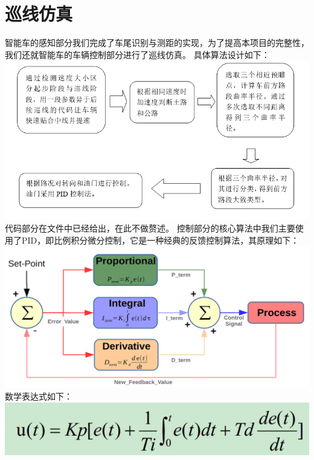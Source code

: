 \documentclass[12pt]{report}
\begin{document}
\section{巡线仿真}
智能车的感知部分我们完成了车尾识别与测距的实现，为了提高本项目的完整性，我们还就智能车的车辆控制部分进行了巡线仿真。
\newline\newline
具体算法设计如下：
\newline
\includegraphics[scale=0.5]{cc.png}
\\代码部分在文件中已经给出，在此不做赘述。
\newline\newline
控制部分的核心算法中我们主要使用了PID，即比例积分微分控制，它是一种经典的反馈控制算法，其原理如下：
\newline 
\includegraphics[scale=0.5]{pid.png}
\newline
数学表达式如下：
\newline
\includegraphics[scale=0.5]{PID2.png}
\newline\newline
\end{document}

